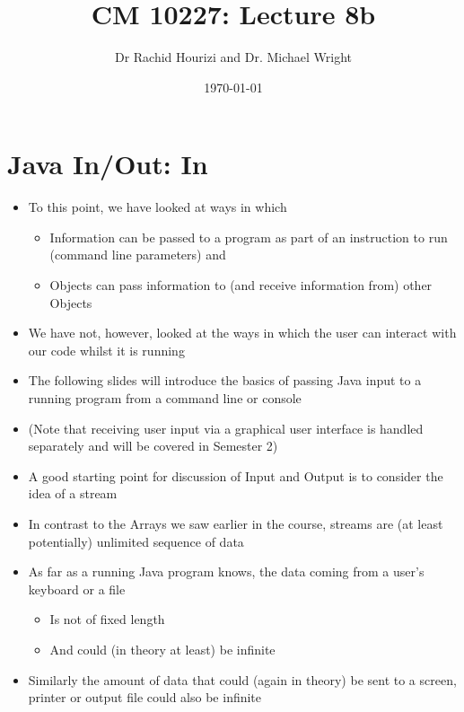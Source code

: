 \documentclass{beamer}
\begin{document}

\title{CM 10227: Lecture 8b}
\author{Dr Rachid Hourizi and Dr. Michael Wright}
\date{\today}
\frame{\titlepage}

\section{Java In/Out: In}
\begin{frame}

\begin{itemize}
\item To this point,  we have looked at ways in which 
\begin{itemize}
\item Information can be passed to a program as part of an instruction to run (command line parameters) and
\item Objects can pass information to (and receive information from) other Objects 
\end{itemize}
\item We have not, however, looked at the ways in which the user can interact with our code whilst it is running
\item The following slides will introduce the basics of passing Java input to a running program from a command line or console 
\item (Note that receiving user input via a graphical user interface is handled separately and will be covered in Semester 2)
\end{itemize}

\end{frame}

\begin{frame}
\begin{itemize}
\item A good starting point for discussion of Input and Output is to consider the idea of a stream
\item In contrast to the Arrays we saw earlier in the course, streams are (at least potentially) unlimited sequence of data 
\item As far as a running Java program knows, the data coming from a user's keyboard or a file

\begin{itemize}
\item Is not of fixed length
\item And could (in theory at least) be infinite
\end{itemize}
\item Similarly the amount of data that could (again in theory) be sent to a screen, printer or output file could also
be infinite
\end{itemize}
\end{frame}
\end{document}
